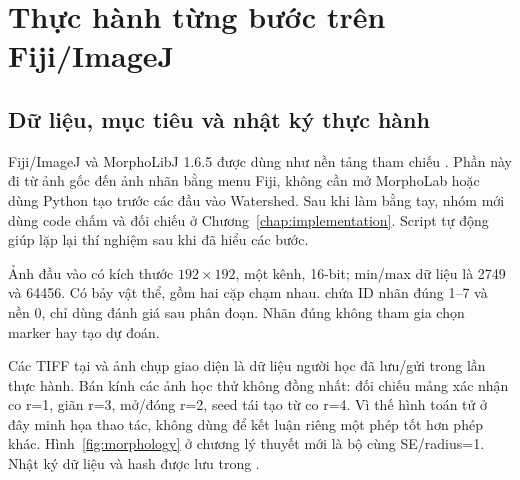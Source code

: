 \chapter{Thực hành từng bước trên Fiji/ImageJ}\label{chap:fiji}
\section{Dữ liệu, mục tiêu và nhật ký thực hành}
Fiji/ImageJ và MorphoLibJ 1.6.5 được dùng như nền tảng tham chiếu \cite{ref1,ref2}. Phần này đi từ ảnh gốc đến ảnh nhãn bằng menu Fiji, không cần mở MorphoLab hoặc dùng Python tạo trước các đầu vào Watershed. Sau khi làm bằng tay, nhóm mới dùng code chấm và đối chiếu ở Chương~\ref{chap:implementation}. Script tự động giúp lặp lại thí nghiệm sau khi đã hiểu các bước.

Ảnh đầu vào  có kích thước $192\times192$, một kênh, 16-bit; min/max dữ liệu là 2749 và 64456. Có bảy vật thể, gồm hai cặp chạm nhau.  chứa ID nhãn đúng 1--7 và nền 0, chỉ dùng đánh giá sau phân đoạn. Nhãn đúng không tham gia chọn marker hay tạo dự đoán.

Các TIFF tại  và ảnh chụp giao diện là dữ liệu người học đã lưu/gửi trong lần thực hành. Bán kính các ảnh học thử không đồng nhất: đối chiếu mảng xác nhận co r=1, giãn r=3, mở/đóng r=2, seed tái tạo từ co r=4. Vì thế hình toán tử ở đây minh họa thao tác, không dùng để kết luận riêng một phép tốt hơn phép khác. Hình~\ref{fig:morphology} ở chương lý thuyết mới là bộ cùng SE/radius=1. Nhật ký dữ liệu và hash được lưu trong .

